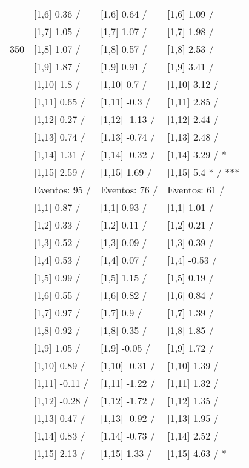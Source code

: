 \begin{table}
\begin{tabular}[t]{llll}
 & {}[1,6] 0.36  / & {}[1,6] 0.64  / & {}[1,6] 1.09  /\\
 & {}[1,7] 1.05  / & {}[1,7] 1.07  / & {}[1,7] 1.98  /\\
350 & {}[1,8] 1.07  / & {}[1,8] 0.57  / & {}[1,8] 2.53  /\\
\addlinespace
 & {}[1,9] 1.87  / & {}[1,9] 0.91  / & {}[1,9] 3.41  /\\
 & {}[1,10] 1.8  / & {}[1,10] 0.7  / & {}[1,10] 3.12  /\\
 & {}[1,11] 0.65  / & {}[1,11] -0.3  / & {}[1,11] 2.85  /\\
 & {}[1,12] 0.27  / & {}[1,12] -1.13  / & {}[1,12] 2.44  /\\
 & {}[1,13] 0.74  / & {}[1,13] -0.74  / & {}[1,13] 2.48  /\\
\addlinespace
 & {}[1,14] 1.31  / & {}[1,14] -0.32  / & {}[1,14] 3.29  / *\\
 & {}[1,15] 2.59  / & {}[1,15] 1.69  / & {}[1,15] 5.4 * / ***\\
 & Eventos:  95 / & Eventos:  76 / & Eventos:  61 /\\
 & {}[1,1] 0.87  / & {}[1,1] 0.93  / & {}[1,1] 1.01  /\\
 & {}[1,2] 0.33  / & {}[1,2] 0.11  / & {}[1,2] 0.21  /\\
\addlinespace
 & {}[1,3] 0.52  / & {}[1,3] 0.09  / & {}[1,3] 0.39  /\\
 & {}[1,4] 0.53  / & {}[1,4] 0.07  / & {}[1,4] -0.53  /\\
 & {}[1,5] 0.99  / & {}[1,5] 1.15  / & {}[1,5] 0.19  /\\
 & {}[1,6] 0.55  / & {}[1,6] 0.82  / & {}[1,6] 0.84  /\\
 & {}[1,7] 0.97  / & {}[1,7] 0.9  / & {}[1,7] 1.39  /\\
\addlinespace
500 & {}[1,8] 0.92  / & {}[1,8] 0.35  / & {}[1,8] 1.85  /\\
 & {}[1,9] 1.05  / & {}[1,9] -0.05  / & {}[1,9] 1.72  /\\
 & {}[1,10] 0.89  / & {}[1,10] -0.31  / & {}[1,10] 1.39  /\\
 & {}[1,11] -0.11  / & {}[1,11] -1.22  / & {}[1,11] 1.32  /\\
 & {}[1,12] -0.28  / & {}[1,12] -1.72  / & {}[1,12] 1.35  /\\
\addlinespace
 & {}[1,13] 0.47  / & {}[1,13] -0.92  / & {}[1,13] 1.95  /\\
 & {}[1,14] 0.83  / & {}[1,14] -0.73  / & {}[1,14] 2.52  /\\
 & {}[1,15] 2.13  / & {}[1,15] 1.33  / & {}[1,15] 4.63  / *\\
\bottomrule
\end{tabular}
\end{table}
